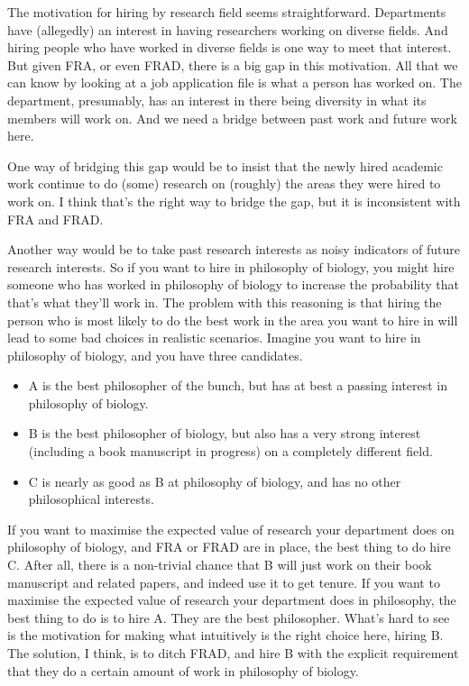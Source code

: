 The motivation for hiring by research field seems straightforward. Departments have (allegedly) an interest in having researchers working on diverse fields. And hiring people who have worked in diverse fields is one way to meet that interest. But given FRA, or even FRAD, there is a big gap in this motivation. All that we can know by looking at a job application file is what a person has worked on. The department, presumably, has an interest in there being diversity in what its members will work on. And we need a bridge between past work and future work here.

One way of bridging this gap would be to insist that the newly hired academic work continue to do (some) research on (roughly) the areas they were hired to work on. I think that's the right way to bridge the gap, but it is inconsistent with FRA and FRAD. 

Another way would be to take past research interests as noisy indicators of future research interests. So if you want to hire in philosophy of biology, you might hire someone who has worked in philosophy of biology to increase the probability that that's what they'll work in. The problem with this reasoning is that hiring the person who is most likely to do the best work in the area you want to hire in will lead to some bad choices in realistic scenarios. Imagine you want to hire in philosophy of biology, and you have three candidates.

\begin{itemize}
\item A is the best philosopher of the bunch, but has at best a passing interest in philosophy of biology.

\item B is the best philosopher of biology, but also has a very strong interest (including a book manuscript in progress) on a completely different field.

\item C is nearly as good as B at philosophy of biology, and has no other philosophical interests.

\end{itemize}
If you want to maximise the expected value of research your department does on philosophy of biology, and FRA or FRAD are in place, the best thing to do hire C. After all, there is a non-trivial chance that B will just work on their book manuscript and related papers, and indeed use it to get tenure. If you want to maximise the expected value of research your department does in philosophy, the best thing to do is to hire A. They are the best philosopher. What's hard to see is the motivation for making what intuitively is the right choice here, hiring B. The solution, I think, is to ditch FRAD, and hire B with the explicit requirement that they do a certain amount of work in philosophy of biology.

